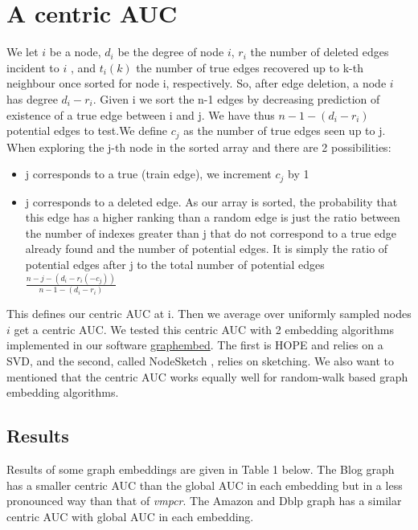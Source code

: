 \documentclass{article}
\begin{document}
\section{A centric AUC}

We let $i$ be a node, $d_{i}$ be the degree of node $i$, $r_{i}$ the number of deleted edges incident to $i$ , and $t_{i}(k)$ the number of true edges
recovered up to k-th neighbour once sorted for node i, respectively. So, after edge deletion, a node $i$ has degree $d_{i} - r_{i}$.
Given i we sort the n-1 edges by decreasing prediction of existence of a true edge between i and j.
We have thus $ n - 1 - (d_{i} - r_{i})$  potential edges to test.We define $c_{j}$  as the number of true edges seen up to j.
When exploring the j-th node in the sorted array and there are 2 possibilities:
\begin{itemize}
    \item j corresponds to a true (train edge), we increment $c_{j}$ by 1
    \item j corresponds to a deleted edge. As our array is sorted, the probability that this edge has a higher
          ranking than a random edge is just the ratio between the number of indexes greater than j that do not correspond
          to a true edge already found and the number of potential edges. It is simply the ratio of potential edges after j to
          the total number of potential edges $ \frac{n-j-(d_{i}-r_{i}(-c_{j}))}{n-1-(d_{i}-r_{i})}$
\end{itemize}
This defines our centric AUC at i.  Then we average over uniformly sampled nodes $i$ get a centric AUC.
We tested this centric AUC with 2 embedding algorithms implemented in our software \href{https://github.com/jean-pierreBoth/graphembed}{\color{blue}graphembed}.
The first is HOPE \citep{Cui} and relies on a SVD, and the second, called NodeSketch \citep{Yang}, relies on sketching. We also want to mentioned that the centric AUC works equally well for random-walk based graph embedding algorithms. 

\subsection{Results}

Results of some graph embeddings are given in Table 1 below. The Blog graph has a smaller centric AUC than the global AUC in each embedding but in a less pronounced way than that of \textit{vmpcr}. The Amazon and Dblp graph has a similar centric AUC with global AUC in each embedding.
\end{document}
